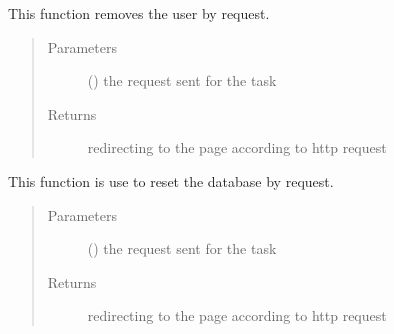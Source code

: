 \documentclass[letterpaper,10pt,english]{sphinxmanual}
\begin{document}
\begin{fulllineitems}
\label{\detokenize{janta:janta.views.remove_user}}
This function removes the user by request.
\begin{quote}\begin{description}
\item[{Parameters}] \leavevmode
{} () \textendash{} the request sent for the task

\item[{Returns}] \leavevmode
redirecting to the page according to http request

\end{description}\end{quote}

\end{fulllineitems}


\begin{fulllineitems}
\label{\detokenize{janta:janta.views.reset_database}}
This function is use to reset the database by request.
\begin{quote}\begin{description}
\item[{Parameters}] \leavevmode
{} () \textendash{} the request sent for the task

\item[{Returns}] \leavevmode
redirecting to the page according to http request

\end{description}\end{quote}

\end{fulllineitems}

\end{document}
